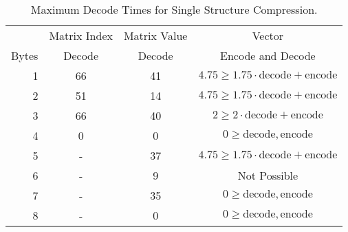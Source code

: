 \begin{table}
	\begin{tabular}{r|S|S|c}
		        & {Matrix Index}  & {Matrix Value} & {Vector}\\
		{Bytes} & {Decode}        & {Decode}       & Encode and Decode \\
		 & 66 & 41 & \(4.75\geq 1.75\cdot\mathrm{decode}+\mathrm{encode}\)\\
		2 & 51 & 14 &\(4.75\geq 1.75\cdot\mathrm{decode}+\mathrm{encode}\)\\
		3 & 66 & 40 &\(2\geq 2\cdot\mathrm{decode}+\mathrm{encode}\)\\
		4 & 0 & 0 &\(0\geq \mathrm{decode},\mathrm{encode}\) \\
		5 & {-} & 37 & \(4.75\geq 1.75\cdot\mathrm{decode}+\mathrm{encode}\)\\
		6 & {-} & 9 & Not Possible\\
		7 & {-} & 35 & \(0\geq \mathrm{decode},\mathrm{encode}\)\\
		8 & {-} & 0 & \(0\geq \mathrm{decode},\mathrm{encode}\)
	\end{tabular}

	\caption{Maximum Decode Times for Single Structure Compression.}
	\label{tab:models-singleComp}
\end{table}